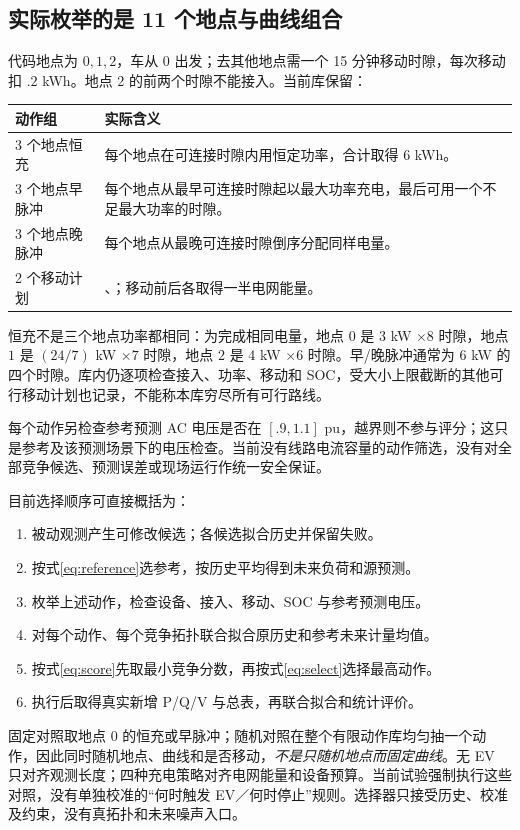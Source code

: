 \documentclass[UTF8,fontset=fandol,11pt,a4paper]{ctexart}
\begin{document}
\subsection{实际枚举的是 11 个地点与曲线组合}
代码地点为 $0,1,2$，车从 $0$ 出发；去其他地点需一个 15 分钟移动时隙，每次移动扣 $.2$ kWh。地点 $2$ 的前两个时隙不能接入。当前库保留：
\begin{center}\small
\begin{tabular}{L{.27\textwidth}L{.61\textwidth}}\toprule
动作组 & 实际含义\\ 个地点恒充 & 每个地点在可连接时隙内用恒定功率，合计取得 6 kWh。\\
3 个地点早脉冲 & 每个地点从最早可连接时隙起以最大功率充电，最后可用一个不足最大功率的时隙。\\
3 个地点晚脉冲 & 每个地点从最晚可连接时隙倒序分配同样电量。\\
2 个移动计划 & 、；移动前后各取得一半电网能量。\\\bottomrule
\end{tabular}
\end{center}
恒充不是三个地点功率都相同：为完成相同电量，地点 $0$ 是 $3$ kW $\times8$ 时隙，地点 $1$ 是 $(24/7)$ kW $\times7$ 时隙，地点 $2$ 是 $4$ kW $\times6$ 时隙。早/晚脉冲通常为 $6$ kW 的四个时隙。库内仍逐项检查接入、功率、移动和 SOC，受大小上限截断的其他可行移动计划也记录，不能称本库穷尽所有可行路线。

每个动作另检查参考预测 AC 电压是否在 $[.9,1.1]$ pu，越界则不参与评分；这只是参考及该预测场景下的电压检查。当前没有线路电流容量的动作筛选，没有对全部竞争候选、预测误差或现场运行作统一安全保证。

目前选择顺序可直接概括为：
\begin{enumerate}
\item 被动观测产生可修改候选；各候选拟合历史并保留失败。
\item 按式\eqref{eq:reference}选参考，按历史平均得到未来负荷和源预测。
\item 枚举上述动作，检查设备、接入、移动、SOC 与参考预测电压。
\item 对每个动作、每个竞争拓扑联合拟合原历史和参考未来计量均值。
\item 按式\eqref{eq:score}先取最小竞争分数，再按式\eqref{eq:select}选择最高动作。
\item 执行后取得真实新增 P/Q/V 与总表，再联合拟合和统计评价。
\end{enumerate}
固定对照取地点 $0$ 的恒充或早脉冲；随机对照在整个有限动作库均匀抽一个动作，因此同时随机地点、曲线和是否移动，\emph{不是只随机地点而固定曲线}。无 EV 只对齐观测长度；四种充电策略对齐电网能量和设备预算。当前试验强制执行这些对照，没有单独校准的“何时触发 EV／何时停止”规则。选择器只接受历史、校准及约束，没有真拓扑和未来噪声入口。
\end{document}
